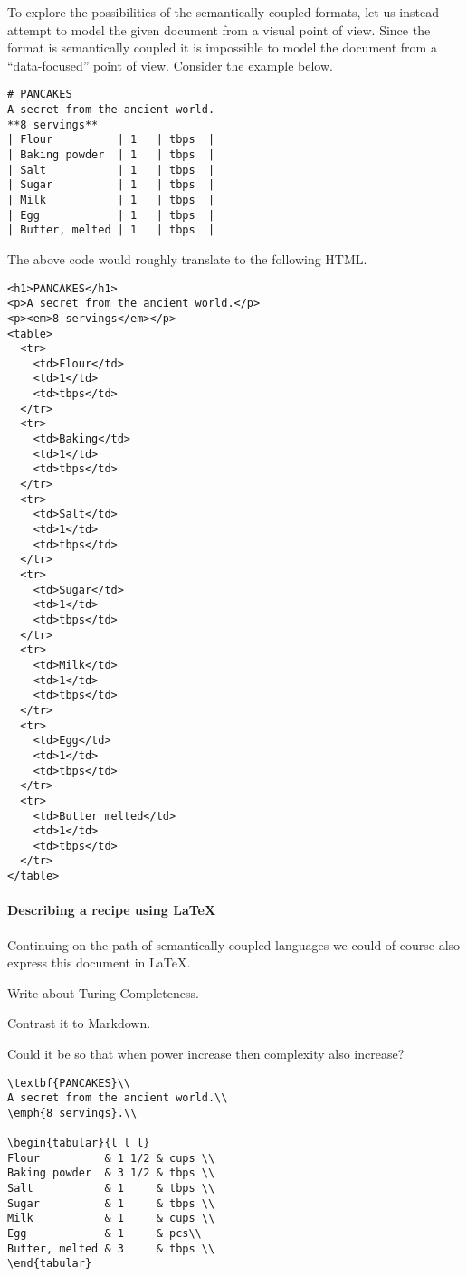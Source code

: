 \documentclass{scrreprt}
\begin{document}
To explore the possibilities of the semantically coupled formats, let us instead attempt to model the given document from a visual point of view. Since the format is semantically coupled it is impossible to model the document from a ``data-focused'' point of view. Consider the example below.
\begin{lstlisting}
# PANCAKES
A secret from the ancient world.
**8 servings**
| Flour          | 1   | tbps  |
| Baking powder  | 1   | tbps  |
| Salt           | 1   | tbps  |
| Sugar          | 1   | tbps  |
| Milk           | 1   | tbps  |
| Egg            | 1   | tbps  |
| Butter, melted | 1   | tbps  |
\end{lstlisting}

The above code would roughly translate to the following HTML.
\begin{lstlisting}
<h1>PANCAKES</h1>
<p>A secret from the ancient world.</p>
<p><em>8 servings</em></p>
<table>
  <tr>
    <td>Flour</td>
    <td>1</td>
    <td>tbps</td>
  </tr>
  <tr>
    <td>Baking</td>
    <td>1</td>
    <td>tbps</td>
  </tr>
  <tr>
    <td>Salt</td>
    <td>1</td>
    <td>tbps</td>
  </tr>
  <tr>
    <td>Sugar</td>
    <td>1</td>
    <td>tbps</td>
  </tr>
  <tr>
    <td>Milk</td>
    <td>1</td>
    <td>tbps</td>
  </tr>
  <tr>
    <td>Egg</td>
    <td>1</td>
    <td>tbps</td>
  </tr>
  <tr>
    <td>Butter melted</td>
    <td>1</td>
    <td>tbps</td>
  </tr>
</table>
\end{lstlisting}




\paragraph{Describing a recipe using LaTeX}
Continuing on the path of semantically coupled languages we could of course also express this document in LaTeX.

Write about Turing Completeness.

Contrast it to Markdown.

Could it be so that when power increase then complexity also increase?
\begin{lstlisting}
\textbf{PANCAKES}\\
A secret from the ancient world.\\
\emph{8 servings}.\\

\begin{tabular}{l l l}
Flour          & 1 1/2 & cups \\
Baking powder  & 3 1/2 & tbps \\
Salt           & 1     & tbps \\
Sugar          & 1     & tbps \\
Milk           & 1     & cups \\
Egg            & 1     & pcs\\
Butter, melted & 3     & tbps \\
\end{tabular}
\end{lstlisting}
\end{document}
